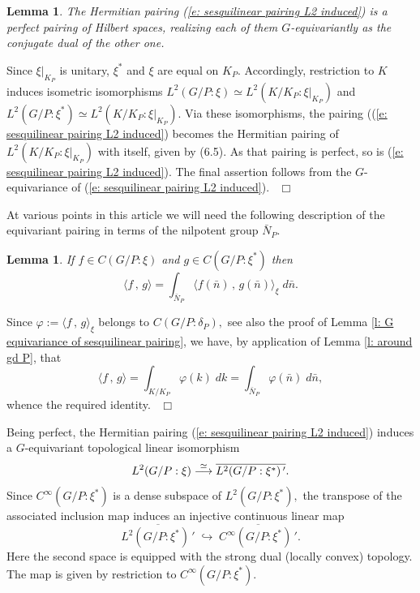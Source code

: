 \documentclass[12pt,a4paper]{article}
\newtheorem{Lemma}[Thm]{Lemma}
\newenvironment{lemma}[0]{\begin{Lemma}\noindent}%
{\end{Lemma}}
\def\proof{\par\noindent{\it Proof.}{\ }{\ }}
\def\qed{~\hfill\hbox{$\Box$}\medbreak}
\def\gd{\delta}
\def\gf{\varphi}
\def\inp#1#2{\langle#1\,,\,#2\rangle}
\numberwithin{Thm}{section}
\numberwithin{equation}{section}
\def\embeds{\hookrightarrow}
\numberwithin{equation}{section}
\begin{document}
\begin{lemma}
The Hermitian pairing (\ref{e: sesquilinear pairing L2 induced}) is a perfect pairing of Hilbert spaces,
realizing each of them $G$-equivariantly as the conjugate dual of the other one.
\end{lemma}

\proof
Since $\xi|_{K_P}$ is unitary, $\xi^*$ and $\xi$ are equal on $K_P.$ 
Accordingly, restriction to $K$ induces isometric isomorphisms
$L^2(G/P:\xi) \simeq L^2(K/K_P:\xi|_{K_P})$ and $L^2(G/P:\xi^*) \simeq L^2(K/K_P:\xi|_{K_P}).$
Via these isomorphisms, the pairing ((\ref{e: sesquilinear pairing L2 induced}) becomes
the Hermitian pairing of $L^2(K/K_P:\xi|_{K_P})$ with itself, given by (6.5). As that pairing 
is perfect, so is (\ref{e: sesquilinear pairing L2 induced}). The final assertion follows
from the $G$-equivariance of (\ref{e: sesquilinear pairing L2 induced}).
\qed

At various points in this article we will need the following description of  the equivariant pairing in terms of the nilpotent group $\bar N_P.$  

\begin{lemma}
If  $f\in C(G / P : \xi) $ and $g \in C(G / P :  \xi^*)$ 
then   
$$ 
\inp{f}{g} = \int_{\bar N_P} \inp{f(\bar n)}{g(\bar n)}_{\xi} \; d\bar n.
$$%
\end{lemma}

\proof
Since $\gf:= \inp{f}{g}_\xi$ belongs to $C(G/P:\gd_P),$ see also the proof of 
Lemma \ref{l: G equivariance of sesquilinear pairing}, we have,
by application of Lemma \ref{l: around gd P}, that 
$$ 
\inp{f}{g} = \int_{K/K_P} \gf(k)\;dk = \int_{\bar N_P} \gf(\bar n)\; d\bar n,
$$%
whence the required identity.
\qed


Being perfect, the Hermitian pairing (\ref{e: sesquilinear pairing L2 induced}) induces 
a $G$-equivariant topological linear isomorphism 
\begin{equation}
\label{e: Ltwo onto conjugate dual of Ltwo}
L^2(G/P: \xi)\; {\buildrel \simeq \over \longrightarrow}  \; \overline{L^2(G/P: \xi^*){\,}'}.
\end{equation} 
Since $C^\infty(G/P:\xi^*)$ is a dense subspace of $L^2(G/P: \xi^*),$ the transpose
of the associated inclusion map induces an injective continuous linear map 
\begin{equation}
\label{e: Ltwo dual into Cinfty dual}
\overline{L^2(G/P: \xi^*){\,}'} \;\embeds \;\overline{C^\infty(G/P:\xi^*){\, }'}.
\end{equation} 
Here the second space is equipped with the strong dual (locally convex) topology. The map 
is given by restriction to $C^\infty(G/P:\xi^*).$
\end{document}

